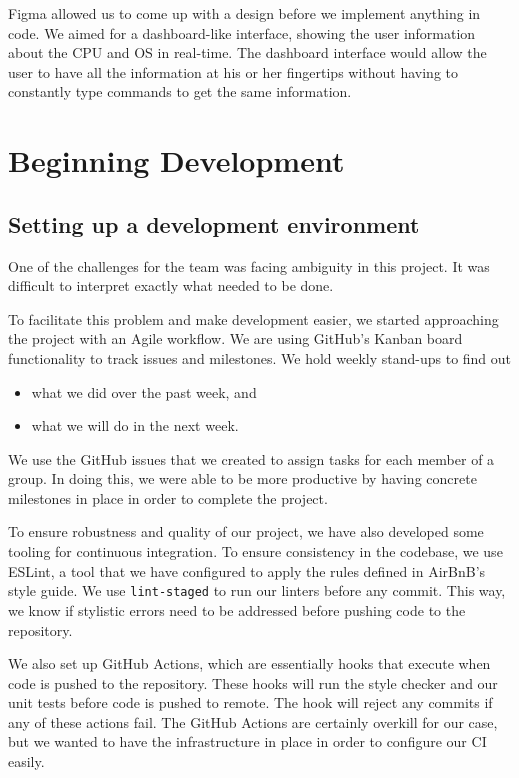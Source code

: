 Figma allowed us to come up with a design before we implement anything in code.
We aimed for a dashboard-like interface, showing the user
information about the CPU and OS in real-time. The dashboard interface would
allow the user to have all the information at his or her fingertips without
having to constantly type commands to get the same information.

\section{Beginning Development}

\subsection*{Setting up a development environment}

One of the challenges for the team was facing ambiguity in this project.
It was difficult to interpret exactly what needed to be done.

To facilitate this problem and make development easier,
we started approaching the project with an Agile workflow.
We are using GitHub's Kanban board functionality to track issues and milestones.
We hold weekly stand-ups to find out

\begin{itemize}
  \item what we did over the past week, and
  \item what we will do in the next week.
\end{itemize}

\noindent
We use the GitHub issues that we created to assign tasks for each member of a group.
In doing this, we were able to be more productive by having concrete milestones in place
in order to complete the project.

To ensure robustness and quality of our project,
we have also developed some tooling for continuous integration.
To ensure consistency in the codebase, we use ESLint, a tool that we have configured
to apply the rules defined in AirBnB's style guide.
We use \texttt{lint-staged} to run our linters before any commit. This way,
we know if stylistic errors need to be addressed before pushing code to the repository.

We also set up GitHub Actions, which are essentially hooks that execute when
code is pushed to the repository.
These hooks will run the style checker and our unit tests before code is pushed to remote.
The hook will reject any commits if any of these actions fail.
The GitHub Actions are certainly overkill for our case, but we wanted to have the infrastructure
in place in order to configure our CI easily.

